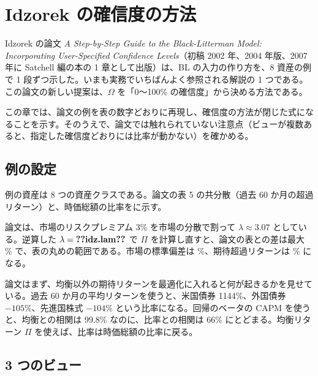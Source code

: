 \chapter{Idzorek の確信度の方法}\label{ch:idzorek}

Idzorek の論文 \textit{A Step-by-Step Guide to the Black-Litterman Model: Incorporating User-Specified Confidence Levels}（初稿 2002 年、2004 年版、2007 年に Satchell 編の本の 1 章として出版）は、BL の入力の作り方を、8 資産の例で 1 段ずつ示した。いまも実務でいちばんよく参照される解説の 1 つである。この論文の新しい提案は、$\Omega$ を「0〜100\% の確信度」から決める方法である。

この章では、論文の例を表の数字どおりに再現し、確信度の方法が閉じた式になることを示す。そのうえで、論文では触れられていない注意点（ビューが複数あると、指定した確信度どおりには比率が動かない）を確かめる。

\section{例の設定}

例の資産は 8 つの資産クラスである。論文の表 5 の共分散（過去 60 か月の超過リターン）と、時価総額の比率をに示す。

\begin{table}[htbp]
\centering
\caption{Idzorek の例の入力（年率 \%）。$\Pi$（論文）は論文の表 1 の値。右端は、論文の表から逆算した $\lambda=\V{idz.lam}$ で $\lambda\Sigma\wmkt$ を計算し直したもの。}
\label{tab:idz-inputs}
\end{table}

論文は、市場のリスクプレミアム 3\% を市場の分散で割って $\lambda\approx3.07$ としている。逆算した $\lambda=\V{idz.lam}$ で $\Pi$ を計算し直すと、論文の表との差は最大 \% で、表の丸めの範囲である。市場の標準偏差は \%、期待超過リターンは \% になる。

論文はまず、均衡以外の期待リターンを最適化に入れると何が起きるかを見せている。過去 60 か月の平均リターンを使うと、米国債券 1144\%、外国債券 $-105\%$、先進国株式 $-104\%$ という比率になる。回帰のベータの CAPM を使うと、均衡との相関は 99.8\% なのに、比率との相関は 66\% にとどまる。均衡リターン $\Pi$ を使えば、比率は時価総額の比率に戻る。

\section{3 つのビュー}

